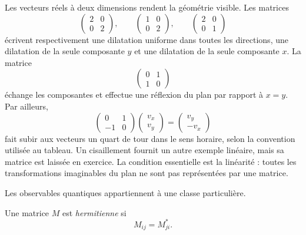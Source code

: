 Les vecteurs réels à deux dimensions rendent la géométrie visible. Les matrices
\begin{equation}
  \begin{pmatrix}2&0\\0&2\end{pmatrix},
  \qquad
  \begin{pmatrix}1&0\\0&2\end{pmatrix},
  \qquad
  \begin{pmatrix}2&0\\0&1\end{pmatrix}
\end{equation}
écrivent respectivement une dilatation uniforme dans toutes les directions, une dilatation de la seule composante \(y\) et une dilatation de la seule composante \(x\). La matrice
\begin{equation}
  \begin{pmatrix}0&1\\1&0\end{pmatrix}
\end{equation}
échange les composantes et effectue une réflexion du plan par rapport à \(x=y\). Par ailleurs,
\begin{equation}
  \begin{pmatrix}0&1\\-1&0\end{pmatrix}
  \begin{pmatrix}v_x\\v_y\end{pmatrix}
  =
  \begin{pmatrix}v_y\\-v_x\end{pmatrix}
  \label{eq:l02-quarter-turn}
\end{equation}fait subir aux vecteurs un quart de tour dans le sens horaire, selon la convention utilisée au tableau. Un cisaillement fournit un autre exemple linéaire, mais sa matrice est laissée en exercice. La condition essentielle est la linéarité : toutes les transformations imaginables du plan ne sont pas représentées par une matrice.

Les observables quantiques appartiennent à une classe particulière.

\begin{definition}
Une matrice \(M\) est \emph{hermitienne} si
\begin{equation}
  M_{ij}=M_{ji}^*.
  \label{eq:l02-hermitian-condition}
\end{equation}
\end{definition}


